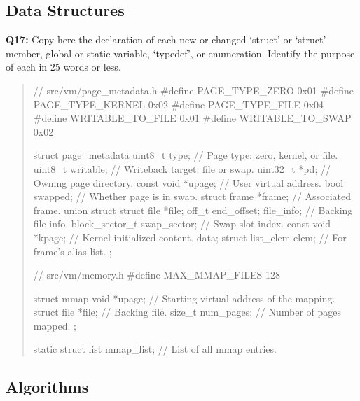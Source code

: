 \documentclass[a4paper,11pt]{paper}
\begin{document}
\subsection{Data Structures}

\textbf{Q17:} Copy here the declaration of each new or changed `struct' or `struct' member, global or static variable, `typedef', or enumeration.  Identify the purpose of each in 25 words or less.
\begin{quote}
\begin{ccode}
// src/vm/page_metadata.h
#define PAGE_TYPE_ZERO    0x01
#define PAGE_TYPE_KERNEL  0x02
#define PAGE_TYPE_FILE    0x04
#define WRITABLE_TO_FILE  0x01
#define WRITABLE_TO_SWAP  0x02

struct page_metadata {
  uint8_t type;              // Page type: zero, kernel, or file.
  uint8_t writable;          // Writeback target: file or swap.
  uint32_t *pd;              // Owning page directory.
  const void *upage;         // User virtual address.
  bool swapped;              // Whether page is in swap.
  struct frame *frame;       // Associated frame.
  union {
    struct {
      struct file *file;
      off_t end_offset;
    } file_info;             // Backing file info.
    block_sector_t swap_sector; // Swap slot index.
    const void *kpage;          // Kernel-initialized content.
  } data;
  struct list_elem elem;     // For frame’s alias list.
};

// src/vm/memory.h
#define MAX_MMAP_FILES 128

struct mmap {
  void *upage;            // Starting virtual address of the mapping.
  struct file *file;      // Backing file.
  size_t num_pages;       // Number of pages mapped.
};

static struct list mmap_list; // List of all mmap entries.
\end{ccode}
\end{quote}


\subsection{Algorithms}
\end{document}
